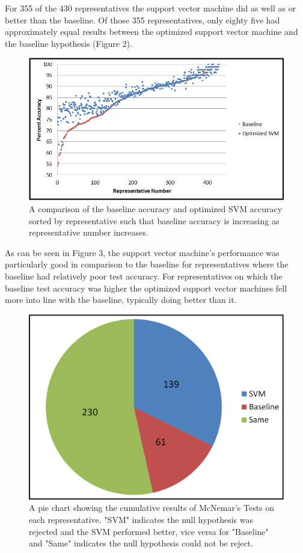 \documentclass[11pt,letterpaper,twocolumn]{article}
\begin{document}
For 355 of the 430 representatives the support vector machine did as well as or better than the baseline. Of those 355 representatives, only eighty five had approximately equal results between the optimized support vector machine and the baseline hypothesis (Figure 2).

\begin{figure}[t]
\includegraphics[width=\linewidth]{accuracy_comparison2.png}
\caption{A comparison of the baseline accuracy and optimized SVM accuracy sorted by representative such that baseline accuracy is increasing as representative number increases.}
\end{figure}

As can be seen in Figure 3, the support vector machine's performance was particularly good in comparison to the baseline for representatives where the baseline had relatively poor test accuracy. For representatives on which the baseline test accuracy was higher the optimized support vector machines fell more into line with the baseline, typically doing better than it.

\begin{figure}
\includegraphics[width=\columnwidth]{mcnemar_results.png}
\caption{A pie chart showing the cumulative results of McNemar's Tests on each representative. "SVM" indicates the null hypothesis was rejected and the SVM performed better, vice versa for "Baseline" and "Same" indicates the null hypothesis could not be reject.}
\end{figure}
\end{document}
